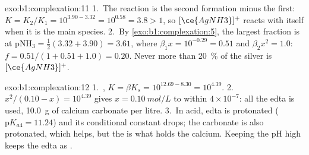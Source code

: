 \begin{solution}{exo:b1:complexation:11}
1.~The reaction is the second formation minus the first: $K = K_2/K_1 =
10^{3.90 - 3.32} = 10^{0.58} = 3.8 > 1$, so $[\ce{AgNH3}]^{+}$ reacts with
itself when it is the main species.
2.~By \cref{exo:b1:complexation:5}, the largest fraction is at
$\mathrm{pNH_3} = \frac12(3.32 + 3.90) = 3.61$, where $\beta_1 x = 10^{-0.29}
= 0.51$ and $\beta_2x^2 = 1.0$: $f = 0.51/(1 + 0.51 + 1.0) = 0.20$. Never
more than \qty{20}{\percent} of the silver is $[\ce{AgNH3}]^{+}$.
\end{solution}

\begin{solution}{exo:b1:complexation:12}
1.~, $K = \beta K_s = 10^{12.69 -
8.30} = 10^{4.39}$.
2.~$x^2/(0.10 - x) = 10^{4.39}$ gives $x = \qty{0.10}{mol/L}$ to within
$4 \times 10^{-7}$: all the edta is used, \qty{10.0}{g} of calcium
carbonate per litre.
3.~In acid, edta is protonated ($\mathrm{p}K_{a4} = 11.24$) and its
conditional constant drops; the carbonate is also protonated, which helps,
but the  is what holds the calcium. Keeping the pH high keeps the
edta as .
\end{solution}

